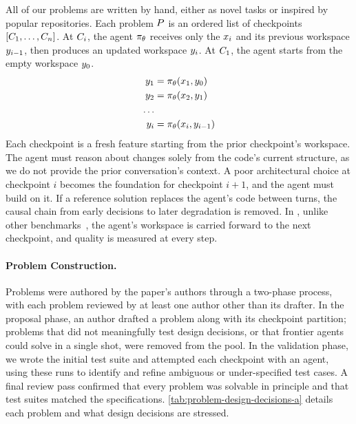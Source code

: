 All of our problems are written by hand, either as novel tasks or inspired by popular repositories. Each problem $P$ is an ordered list of checkpoints $[C_{1},\ldots,C_{n}]$. At $C_{i}$, the agent $\pi_{\theta}$ receives only the $x_{i}$ and its previous workspace $y_{i-1}$, then produces an updated workspace $y_{i}$. At $C_{1}$, the agent starts from the empty workspace $y_{0}$.
\begin{equation}\label{eq:problem-setup}
    \begin{aligned}
        y_{1} &= \pi_{\theta}(x_{1}, y_{0}) \\
        y_{2} &= \pi_{\theta}(x_{2}, y_{1})\\
        \ldots \\
        y_{i} &= \pi_{\theta}(x_{i}, y_{i-1})
    \end{aligned}
\end{equation}
Each checkpoint is a fresh feature starting from the prior checkpoint's workspace. The agent must reason about changes solely from the code's current structure, as we do not provide the prior conversation's context. A poor architectural choice at checkpoint $i$ becomes the foundation for checkpoint $i+1$, and the agent must build on it. If a reference solution replaces the agent's code between turns, the causal chain from early decisions to later degradation is removed. In \scb{}, unlike other benchmarks~\citep{codeflowbench, maintaincoder, evoclaw}, the agent's workspace is carried forward to the next checkpoint, and quality is measured at every step.

\paragraph{Problem Construction.} Problems were authored by the paper's authors through a two-phase process, with each problem reviewed by at least one author other than its drafter. In the proposal phase, an author drafted a problem along with its checkpoint partition; problems that did not meaningfully test design decisions, or that frontier agents could solve in a single shot, were removed from the pool. In the validation phase, we wrote the initial test suite and attempted each checkpoint with an agent, using these runs to identify and refine ambiguous or under-specified test cases. A final review pass confirmed that every problem was solvable in principle and that test suites matched the specifications. \autoref{tab:problem-design-decisions-a} details each problem and what design decisions are stressed.

